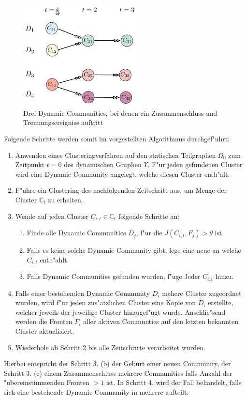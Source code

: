 \documentclass[journal]{vgtc}
\begin{document}
    
    \begin{figure}[b]
      \centering
      \includegraphics[width=2.5in]{images/dynamic_communities2}
      \caption{\label{fig:dynamic2}  Drei Dynamic Communities, bei denen ein Zusammenschluss und Trennungsereigniss auftritt \cite{timestep}}
    \end{figure}
    Folgende Schritte werden somit im \cite{timestep} vorgestellten Algorithmus durchgef"uhrt:
    \begin{enumerate}
      \item Anwenden eines Clusteringverfahren auf den statischen Teilgraphen $\Omega_0$ zum Zeitpunkt $t=0$ des dynamischen Graphen $\Upsilon$. F"ur jeden gefundenen
	    Cluster wird eine Dynamic Community angelegt, welche diesen Cluster enth"alt.
      \item F"uhre ein Clustering des nachfolgenden Zeitschritt aus, um Menge der Cluster $\mathbb{C}_t$ zu erhalten.
      \item Wende auf jeden Cluster $C_{i,t} \in \mathbb{C}_t$ folgende Schritte an:
      \begin{enumerate}
	\item Finde alle Dynamic Communities $D_j$, f"ur die $J(C_{i,t},F_j) > \theta$ ist.
	\item Falls es keine solche Dynamic Community gibt, lege eine neue an welche $C_{i,t}$ enth"ahlt.
	\item Falls Dynamic Communities gefunden wurden, f"uge Jeder $C_{i,t}$ hinzu.
      \end{enumerate}
      \item Falls einer bestehenden Dynamic Community $D_i$ mehere Cluster zugeordnet wurden, wird f"ur jeden zus"atzlichen Cluster eine Kopie von $D_i$ erstellte,
	    welcher jeweils der jeweilige Cluster hinzugef"ugt wurde.
	    Anschlie"send werden die Fronten $F_i$ aller aktiven Communties auf den letzten bekannten Cluster aktualisiert.
      \item Wiederhole ab Schritt 2 bis alle Zeitschritte verarbeitet wurden.
    \end{enumerate}
    Hierbei entspricht der Schritt 3. (b) der Geburt einer neuen Community, der Schritt 3. (c) einem Zusammenschluss mehrere Communities falls Anzahl der "ubereinstimmenden
    Fronten $>1$ ist. In Schritt 4. wird der Fall behandelt, falls sich eine bestehende Dynamic Community in mehrere aufteilt.
\end{document}
